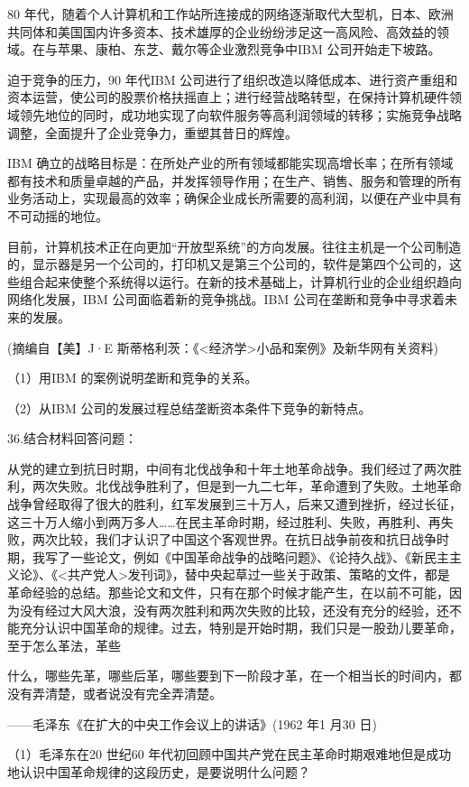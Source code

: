 \documentclass[UTF8,11pt]{ctexart}
\begin{document}
80 年代，随着个人计算机和工作站所连接成的网络逐渐取代大型机，日本、欧洲共同体和美国国内许多资本、技术雄厚的企业纷纷涉足这一高风险、高效益的领域。在与苹果、康柏、东芝、戴尔等企业激烈竞争中IBM 公司开始走下坡路。

迫于竞争的压力，90 年代IBM 公司进行了组织改造以降低成本、进行资产重组和资本运营，使公司的股票价格扶摇直上；进行经营战略转型，在保持计算机硬件领域领先地位的同时，成功地实现了向软件服务等高利润领域的转移；实施竞争战略调整，全面提升了企业竞争力，重塑其昔日的辉煌。

IBM 确立的战略目标是：在所处产业的所有领域都能实现高增长率；在所有领域都有技术和质量卓越的产品，并发挥领导作用；在生产、销售、服务和管理的所有业务活动上，实现最高的效率；确保企业成长所需要的高利润，以便在产业中具有不可动摇的地位。

目前，计算机技术正在向更加“开放型系统”的方向发展。往往主机是一个公司制造的，显示器是另一个公司的，打印机又是第三个公司的，软件是第四个公司的，这些组合起来使整个系统得以运行。在新的技术基础上，计算机行业的企业组织趋向网络化发展，IBM 公司面临着新的竞争挑战。IBM 公司在垄断和竞争中寻求着未来的发展。

(摘编自【美】J·E 斯蒂格利茨：《<经济学>小品和案例》及新华网有关资料)

（1）用IBM 的案例说明垄断和竞争的关系。


（2）从IBM 公司的发展过程总结垄断资本条件下竞争的新特点。


36.结合材料回答问题：

从党的建立到抗日时期，中间有北伐战争和十年土地革命战争。我们经过了两次胜利，两次失败。北伐战争胜利了，但是到一九二七年，革命遭到了失败。土地革命战争曾经取得了很大的胜利，红军发展到三十万人，后来又遭到挫折，经过长征，这三十万人缩小到两万多人……在民主革命时期，经过胜利、失败，再胜利、再失败，两次比较，我们才认识了中国这个客观世界。在抗日战争前夜和抗日战争时期，我写了一些论文，例如《中国革命战争的战略问题》、《论持久战》、《新民主主义论》、《<共产党人>发刊词》，替中央起草过一些关于政策、策略的文件，都是革命经验的总结。那些论文和文件，只有在那个时候才能产生，在以前不可能，因为没有经过大风大浪，没有两次胜利和两次失败的比较，还没有充分的经验，还不能充分认识中国革命的规律。过去，特别是开始时期，我们只是一股劲儿要革命，至于怎么革法，革些

什么，哪些先革，哪些后革，哪些要到下一阶段才革，在一个相当长的时间内，都没有弄清楚，或者说没有完全弄清楚。

——毛泽东《在扩大的中央工作会议上的讲话》(1962 年1 月30 日)

（1）毛泽东在20 世纪60 年代初回顾中国共产党在民主革命时期艰难地但是成功地认识中国革命规律的这段历史，是要说明什么问题？
\end{document}
